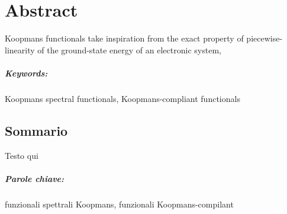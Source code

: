 \begingroup
\let\cleardoublepage\clearpage

\cleardoublepage
\chapter*{Abstract}
\vspace{2cm}
%
Koopmans functionals take inspiration from the exact property of piecewise-linearity of the ground-state energy of an electronic system,
%
\paragraph{Keywords:}
Koopmans spectral functionals,
Koopmans-compliant functionals
%

\begin{otherlanguage}{italian}
\cleardoublepage
\chapter*{Sommario}
\vspace{2cm}
%
Testo qui
%
\paragraph{Parole chiave:}
funzionali spettrali Koopmans,
funzionali Koopmans-compilant
%
\end{otherlanguage}

\endgroup			
\vfill
